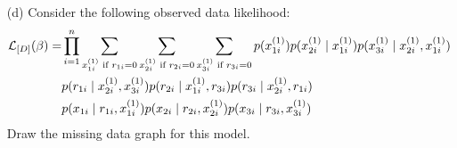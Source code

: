 \documentclass[11pt]{article}
\renewcommand{\vec}[1]{\mathbf{#1}}
\begin{document}
\begin{enumerate}
\begin{answertext}{4cm}{}

Expanded form:\\
$p(x_1,x_2,x_3,x_4,r_2,r_4)=p(x_1)p(x_3)p(r_2|x_1)p(r_4|x_1,x_3)p(x_2^{(1)}|x_1)p(x_4^{(1)}|x_3)p(x_2|x_2^{(1)},r_2)\\p(x_4|x_4^{(1)},r_4)$\\
Handle $x_2^{(1)}$ and $x_4^{(1)}$:
$p(x_1,x_2^{(1)},x_3,x_4^{(1)})=\Sigma_{r_2,r_4} \int_{x_2} \int_{x_4}p(x_1,x_2,x_3,x_4,r_2,r_4)dx_2dx_4$.\\
Substituting and simplifying results in:

$p(x_1,x_2^{(1)},x_3,x_4^{(1)})=p(x_1)p(x_3)\Sigma_{r_2} p(r_2|x_1)\Sigma_{r_4} p(r_4|x_1,x_3)p(x_2^{(1)}|x_1)p(x_4^{(1)}|x_3)$
    
\end{answertext}
\item[(d)] Consider the following observed data likelihood:
{\small
\begin{align*}
{\cal L}_{[D]}(\vec{\beta}) =&
\prod_{i=1}^n
\sum_{x^{(1)}_{1i} \text{ if }r_{1i}=0}
\sum_{x^{(1)}_{2i} \text{ if }r_{2i}=0}
\sum_{x^{(1)}_{3i} \text{ if }r_{3i}=0}
p(x^{(1)}_{1i}) p(x^{(1)}_{2i} \mid x^{(1)}_{1i})
p(x^{(1)}_{3i} \mid x^{(1)}_{2i}, x^{(1)}_{1i})\\
& 
p(r_{1i} \mid x^{(1)}_{2i}, x^{(1)}_{3i})
p(r_{2i} \mid x^{(1)}_{1i}, r_{3i})
p(r_{3i} \mid x^{(1)}_{2i}, r_{1i})
\\
&
p(x_{1i} \mid r_{1i}, x^{(1)}_{1i})
p(x_{2i} \mid r_{2i}, x^{(1)}_{2i})
p(x_{3i} \mid r_{3i}, x^{(1)}_{3i})
\end{align*}
}
Draw the missing data graph for this model.

\begin{answertext}{6.7cm}{}

\end{answertext}
\end{enumerate}
\end{document}
